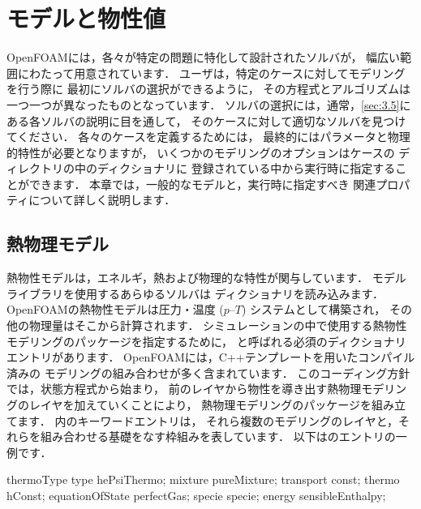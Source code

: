 \chapter{モデルと物性値}
\label{chap:7}
OpenFOAMには，各々が特定の問題に特化して設計されたソルバが，
幅広い範囲にわたって用意されています．
ユーザは，特定のケースに対してモデリングを行う際に
最初にソルバの選択ができるように，
その方程式とアルゴリズムは一つ一つが異なったものとなっています．
ソルバの選択には，通常，\autoref{sec:3.5}にある各ソルバの説明に目を通して，
そのケースに対して適切なソルバを見つけてください．
各々のケースを定義するためには，
最終的にはパラメータと物理的特性が必要となりますが，
いくつかのモデリングのオプションはケースの
%
%
ディレクトリの中のディクショナリに
登録されている中から実行時に指定することができます．
本章では，一般的なモデルと，実行時に指定すべき
関連プロパティについて詳しく説明します．



\section{熱物理モデル}
\label{sec:7.1}
熱物性モデルは，エネルギ，熱および物理的な特性が関与しています．
%
%
モデルライブラリを使用するあらゆるソルバは
%
%
ディクショナリを読み込みます．
OpenFOAMの熱物性モデルは圧力・温度 ($p$--$T$) システムとして構築され，
その他の物理量はそこから計算されます．
シミュレーションの中で使用する熱物性モデリングのパッケージを指定するために，
%
%
と呼ばれる必須のディクショナリエントリがあります．
OpenFOAMには，C++テンプレートを用いたコンパイル済みの
モデリングの組み合わせが多く含まれています．
このコーディング方針では，状態方程式から始まり，
前のレイヤから物性を導き出す熱物理モデリングのレイヤを加えていくことにより，
熱物理モデリングのパッケージを組み立てます．
内のキーワードエントリは，
それら複数のモデリングのレイヤと，それらを組み合わせる基礎をなす枠組みを表しています．
以下はのエントリの一例です．
\begin{OFverbatim}[file]
thermoType
{
    type            hePsiThermo;
    mixture         pureMixture;
    transport       const;
    thermo          hConst;
    equationOfState perfectGas;
    specie          specie;
    energy          sensibleEnthalpy;
}
\end{OFverbatim}


